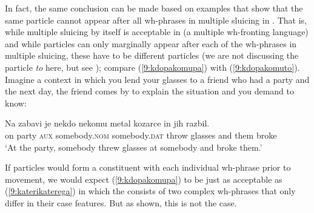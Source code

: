 \documentclass[output=paper,modfonts,newtxmath,hidelinks]{langscibook}
\begin{document}
\noindent In fact, the same conclusion can be made based on examples that show that the same particle cannot appear after all wh-phrases in multiple sluicing in . That is, while multiple sluicing by itself is acceptable in  (a multiple wh-fronting language) and while particles can only marginally appear after each of the wh-phrases in multiple sluicing, these have to be different particles (we are not discussing the particle \textit{to} here, but see \citealt{marusicetal2015}); compare (\ref{9:kdopakomupa}) with (\ref{9:kdopakomuto}). Imagine a context in which you lend your glasses to a friend who had a party and the next day, the friend comes by to explain the situation and you demand to know:  

\begin{exe}
\ex \gll 
Na zabavi je nekdo nekomu metal kozarce in jih razbil. \\
on party \textsc{aux} somebody.\textsc{nom} somebody.\textsc{dat} throw glasses and them broke\\
\trans `At the party, somebody threw glasses at somebody and broke them.'

\ex \label{9:kdokomuvsi}\begin{xlist}
\label{9:kdokomu}
 \label{9:kdopakomupa}
\label{9:kdokomupa}
\label{9:kdopakomu}
\label{9:kdopakomuto}
\end{xlist}\end{exe}

\noindent If particles would form a constituent with each individual wh-phrase prior to movement, we would expect (\ref{9:kdopakomupa}) to be just as acceptable as (\ref{9:katerikaterega}) in which the  consists of two complex wh-phrases that only differ in their case features. But as shown, this is not the case. 
\end{document}
